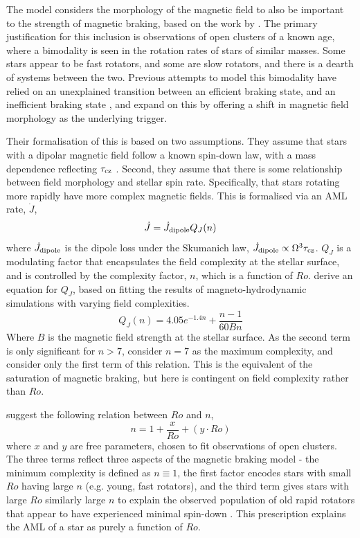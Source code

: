 The \citet{garraffo2018a} model considers the morphology of the magnetic field to also be important to the strength of magnetic braking, based on the work by \citet{garraffo2015}. The primary justification for this inclusion is observations of open clusters of a known age, where a bimodality is seen in the rotation rates of stars of similar masses. Some stars appear to be fast rotators, and some are slow rotators, and there is a dearth of systems between the two.
Previous attempts to model this bimodality have relied on an unexplained transition between an efficient braking state, and an inefficient braking state \citep{spada2011,reiners2012, gallet2013}, and \citet{garraffo2018a} expand on this by offering a shift in magnetic field morphology as the underlying trigger.

Their formalisation of this is based on two assumptions. They assume that stars with a dipolar magnetic field follow a known spin-down law, with a mass dependence reflecting $\tau_{\rm cz}$ \citep{skumanich1972}. Second, they assume that there is some relationship between field morphology and stellar spin rate. Specifically, that stars rotating more rapidly have more complex magnetic fields. This is formalised via an AML rate, $\dot J$,
\begin{equation}
    \dot J = \dot J_{\rm dipole}Q_J(n)
\end{equation}
where $\dot J_{\rm dipole}$ is the dipole loss under the Skumanich law, $\dot J_{\rm dipole} \propto \Omega^3 \tau_{\rm cz}$. $Q_J$ is a modulating factor that encapsulates the field complexity at the stellar surface, and is controlled by the complexity factor, $n$, which is a function of $Ro$. \citet{garraffo2016} derive an equation for $Q_J$, based on fitting the results of magneto-hydrodynamic simulations with varying field complexities.
\begin{equation}
    \label{eqn:introduction:garraffo complexity modulation}
    Q_J(n) = 4.05 e^{-1.4n} + \frac{n-1}{60Bn}
\end{equation}
Where $B$ is the magnetic field strength at the stellar surface. As the second term is only significant for $n > 7$, \citet{garraffo2018a} consider $n = 7$ as the maximum complexity, and consider only the first term of this relation. This is the equivalent of the saturation of magnetic braking, but here is contingent on field complexity rather than $Ro$.

\citet{garraffo2018a} suggest the following relation between $Ro$ and $n$,
\begin{equation}
    \label{eqn:introduction:garraffo field complexity}
    n = 1 + \frac{x}{Ro} + (y \cdot Ro)
\end{equation}
where $x$ and $y$ are free parameters, chosen to fit observations of open clusters. The three terms reflect three aspects of the magnetic braking model - the minimum complexity is defined as $n \equiv 1$, the first factor encodes stars with small $Ro$ having large $n$ (e.g. young, fast rotators), and the third term gives stars with large $Ro$ similarly large $n$ to explain the observed population of old rapid rotators that appear to have experienced minimal spin-down \citep{vanSaders2016}.
This prescription explains the AML of a star as purely a function of $Ro$.

